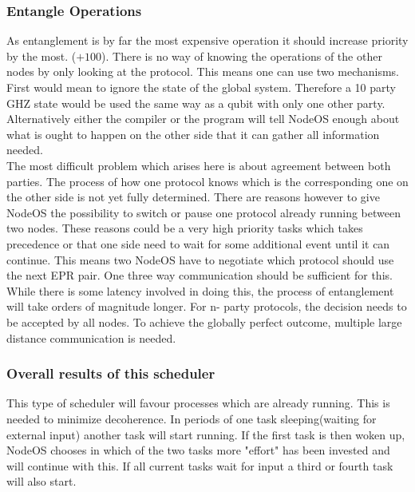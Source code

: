 \documentclass[]{article}
\begin{document}
\subsubsection{Entangle Operations}
As entanglement is by far the most expensive operation it should increase priority by the most. ($+100$). There is no way of knowing the operations of the other nodes by only looking at the protocol. This means one can use two mechanisms. First would mean to ignore the state of the global system. Therefore a 10 party GHZ state would be used the same way as a qubit with only one other party. Alternatively either the compiler or the program will tell NodeOS enough about what is ought to happen on the other side that it can gather all information needed. \\
The most difficult problem which arises here is about agreement between both parties. The process of how one protocol knows which is the corresponding one on the other side is not yet fully determined. There are reasons however to give NodeOS the possibility to switch or pause one protocol already running between two nodes. These reasons could be a very high priority tasks which takes precedence or that one side need to wait for some additional event until it can continue. This means two NodeOS have to negotiate which protocol should use the next EPR pair. One three way communication should be sufficient for this. While there is some latency involved in doing this, the process of entanglement will take orders of magnitude longer. For n- party protocols, the decision needs to be accepted by all nodes. To achieve the globally perfect outcome, multiple large distance communication is needed. 
\subsubsection{Overall results of this scheduler}
This type of scheduler will favour processes which are already running. This is needed to minimize decoherence. In periods of one task sleeping(waiting for external input) another task will start running. If the first task is then woken up, NodeOS chooses in which of the two tasks more "effort" has been invested and will continue with this. If all current tasks wait for input a third or fourth task will also start. \\
\end{document}
